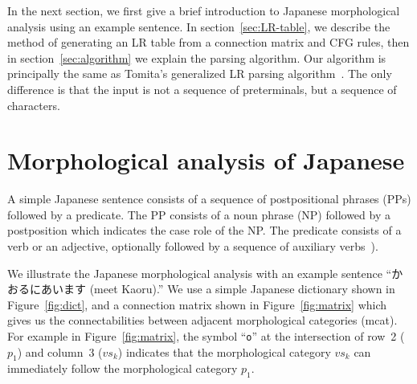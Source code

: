 In the next section, we first give a brief introduction to Japanese
morphological analysis using an example sentence. In
section~\ref{sec:LR-table}, we describe the method of generating an LR
table from a connection matrix and CFG rules, then in
section~\ref{sec:algorithm} we explain the parsing algorithm. Our
algorithm is principally the same as Tomita's generalized LR parsing
algorithm~\cite{tomita:86:a}. The only difference is that the input is
not a sequence of preterminals, but a sequence of characters.

\section{Morphological analysis of Japanese}

A simple Japanese sentence consists of a sequence of postpositional
phrases (PPs) followed by a predicate. The PP consists of a noun
phrase (NP) followed by a postposition which indicates the case role
of the NP. The predicate consists of a verb or an adjective,
optionally followed by a sequence of auxiliary verbs~\cite{morioka:87:a}).

We illustrate the Japanese morphological analysis with an example
sentence ``かおるにあいます (meet Kaoru).'' We use a simple Japanese
dictionary shown in Figure~\ref{fig:dict}, and a connection matrix
shown in Figure~\ref{fig:matrix} which gives us the connectabilities
between adjacent morphological categories (mcat). For example in
Figure~\ref{fig:matrix}, the symbol ``{\tt o}'' at the intersection of
row~2 ($p_1$) and column~3 ($vs_k$) indicates that the morphological
category $vs_k$ can immediately follow the morphological category
$p_1$.

\begin{center}
  \def\arraystretch{}
  
\end{center}

\begin{center}
  \def\arraystretch{}
  
\end{center}
    
